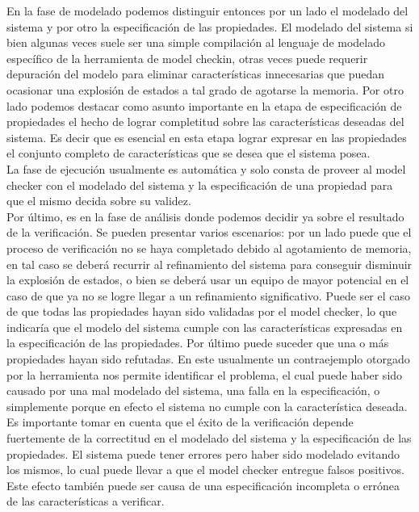 \documentclass[titlepage, 12pt]{book}
\begin{document}
En la fase de modelado podemos distinguir entonces por un lado el modelado del sistema y por otro la especificaci\'on de las propiedades. El modelado del sistema si bien algunas veces suele ser una simple compilaci\'on al lenguaje de modelado espec\'ifico de la herramienta de model checkin, otras veces puede requerir depuraci\'on del modelo para eliminar caracter\'isticas innecesarias que puedan ocasionar una explosi\'on de estados a tal grado de agotarse la memoria. Por otro lado podemos destacar como asunto importante en la etapa de especificaci\'on de propiedades el hecho de lograr completitud sobre las caracter\'isticas deseadas del sistema. Es decir que es esencial en esta etapa lograr expresar en las propiedades el conjunto completo de caracter\'isticas que se desea que el sistema posea.\\

La fase de ejecuci\'on usualmente es autom\'atica y solo consta de proveer al model checker con el modelado del sistema y la especificaci\'on de una propiedad para que el mismo decida sobre su validez.\\

Por \'ultimo, es en la fase de an\'alisis donde podemos decidir ya sobre el resultado de la verificaci\'on. Se pueden presentar varios escenarios: por un lado puede que el proceso de verificaci\'on no se haya completado debido al agotamiento de memoria, en tal caso se deber\'a recurrir al refinamiento del sistema para conseguir disminuir la explosi\'on de estados, o bien se deber\'a usar un equipo de mayor potencial en el caso de que ya no se logre llegar a un refinamiento significativo. Puede ser el caso de que todas las propiedades hayan sido validadas por el model checker, lo que indicar\'ia que el modelo del sistema cumple con las caracter\'isticas expresadas en la especificaci\'on de las propiedades. Por \'ultimo puede suceder que una o m\'as propiedades hayan sido refutadas. En este usualmente un contraejemplo otorgado por la herramienta nos permite identificar el problema, el cual puede haber sido causado por una mal modelado del sistema, una falla en la especificaci\'on, o simplemente porque en efecto el sistema no cumple con la caracter\'istica deseada.\\

Es importante tomar en cuenta que el \'exito de la verificaci\'on depende fuertemente de la correctitud en el modelado del sistema y la especificaci\'on de las propiedades. El sistema puede tener errores pero haber sido modelado evitando los mismos, lo cual puede llevar a que el model checker entregue falsos positivos. Este efecto tambi\'en puede ser causa de una especificaci\'on incompleta o err\'onea de las caracter\'isticas a verificar.\\
\end{document}
